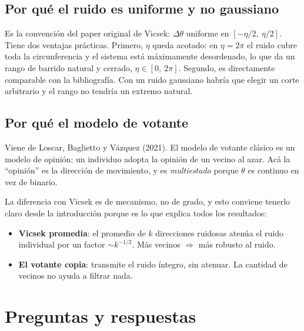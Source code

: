 \documentclass[11pt]{article}
\begin{document}
\subsection{Por qué el ruido es uniforme y no gaussiano}

Es la convención del paper original de Vicsek: $\Delta\theta$ uniforme en
$[-\eta/2,\ \eta/2]$. Tiene dos ventajas prácticas. Primero, $\eta$ queda
acotado: en $\eta = 2\pi$ el ruido cubre toda la circunferencia y el sistema
está máximamente desordenado, lo que da un rango de barrido natural y cerrado,
$\eta \in [0,\ 2\pi]$. Segundo, es directamente comparable con la bibliografía.
Con un ruido gaussiano habría que elegir un corte arbitrario y el rango no
tendría un extremo natural.

\subsection{Por qué el modelo de votante}

Viene de Loscar, Baglietto y Vázquez (2021). El modelo de votante clásico es un
modelo de opinión: un individuo adopta la opinión de un vecino al azar. Acá la
``opinión'' es la dirección de movimiento, y es \emph{multiestado} porque
$\theta$ es continuo en vez de binario.

La diferencia con Vicsek es de mecanismo, no de grado, y esto conviene tenerlo
claro desde la introducción porque es lo que explica todos los resultados:

\begin{itemize}
  \item \textbf{Vicsek promedia}: el promedio de $k$ direcciones ruidosas
    atenúa el ruido individual por un factor $\sim k^{-1/2}$. Más vecinos
    $\Rightarrow$ más robusto al ruido.
  \item \textbf{El votante copia}: transmite el ruido íntegro, sin atenuar. La
    cantidad de vecinos no ayuda a filtrar nada.
\end{itemize}


\section{Preguntas y respuestas}
\end{document}

